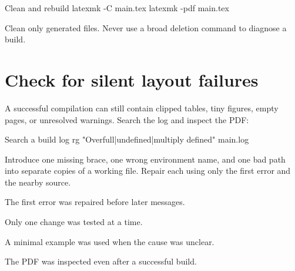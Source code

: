 \begin{terminalcode}{Clean and rebuild}
latexmk -C main.tex
latexmk -pdf main.tex
\end{terminalcode}

Clean only generated files. Never use a broad deletion command to diagnose a
build.

\section{Check for silent layout failures}

A successful compilation can still contain clipped tables, tiny figures,
empty pages, or unresolved warnings. Search the log and inspect the PDF:

\begin{terminalcode}{Search a build log}
rg "Overfull|undefined|multiply defined" main.log
\end{terminalcode}

\begin{codelab}
Introduce one missing brace, one wrong environment name, and one bad path into
separate copies of a working file. Repair each using only the first error and
the nearby source.
\end{codelab}

\begin{chapterchecklist}
  \item The first error was repaired before later messages.
  \item Only one change was tested at a time.
  \item A minimal example was used when the cause was unclear.
  \item The PDF was inspected even after a successful build.
\end{chapterchecklist}
